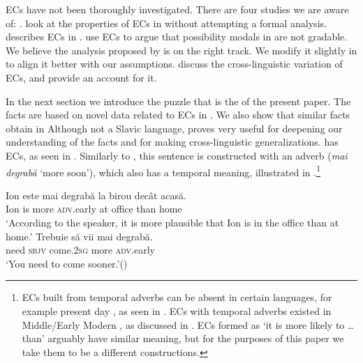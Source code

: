 \documentclass[output=paper,colorlinks,citecolor=brown,newtxmath]{langsci/langscibook}
\begin{document}
\noindent ECs have not been thoroughly investigated. There are four studies we are aware of: \citet{finkra14,herrub14,gon14,goniri17a}. \citet{finkra14} look at the properties  of ECs in  without attempting a formal analysis. \citet{gon14} describes ECs in . \citet{herrub14} use  ECs to argue that possibility modals in  are not gradable. We believe the analysis proposed by \citet{herrub14} is on the right track. We modify it slightly in   to align it better with our assumptions. \citet{goniri17a} discuss the cross-linguistic variation of ECs, and provide an account for it.

In the next section we introduce the  puzzle that is the  of the present paper. The facts are based on novel  data related to ECs in . We also show that similar facts obtain in  Although not a Slavic language,  proves very useful for deepening our understanding of the  facts and for making cross-linguistic generalizations.  has ECs, as seen in . Similarly to , this sentence is constructed with an adverb (\textit{mai degrabă} `more soon'), which also has a temporal meaning, illustrated in .\footnote{ECs built from temporal adverbs can be  absent in certain languages, for example present day , as seen in . ECs with temporal adverbs existed in Middle/Early Modern , as discussed in \citet{ger16}. ECs formed as `it is more likely to {\ldots} than' arguably have similar meaning, but for the purposes of this paper we take them to be a different constructions.

 	\zlast
 	}

 	\ea
 	\ea\label{RomEC}\gll Ion este mai degrabă la birou decât acasă.\\
	Ion is more \textsc{adv}.early at office than home\\
	\glt `According to the speaker, it is more plausible that Ion is in the office than at home.'
	\ex\label{RomTempAdv}\gll Trebuie să vii mai degrabă.\\
	need \textsc{sbjv} come.\textsc{2sg} more  \textsc{adv}.early\\
	\glt `You need to come sooner.'\hfill ()
	\z\z
\end{document}
